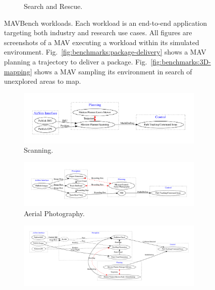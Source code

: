 \begin{figure}[t]
\begin{subfigure}[t]{1.385in}
        \caption{Search and Rescue.}\label{fig:benchmarks:search-and-rescue}
	\end{subfigure}
    \vspace{-5pt}
    \caption{MAVBench workloads. Each workload is an end-to-end application targeting both industry and research use cases. All figures are screenshots of a MAV executing a workload within its simulated environment. Fig.~\ref{fig:benchmarks:package-delivery} shows a MAV planning a trajectory to deliver a package. Fig.~\ref{fig:benchmarks:3D-mapping} shows a MAV sampling its environment in search of unexplored areas to map.}
    \label{fig:bench_screenshot}
\end{figure}

\begin{figure}[t!]
	\centering
	\begin{subfigure}[t]{\columnwidth}
		\centering
        \vspace{-5pt}
		\includegraphics[width=\columnwidth]{figs/data_flow/scanning}
        \vspace{-20pt}
\caption{Scanning.}\label{fig:benchmarks:data-flow:scanning}
	\end{subfigure}
    \begin{subfigure}[t]{\columnwidth}
		\centering
		\includegraphics[width=\columnwidth]{figs/data_flow/aerial_photography}
        \vspace{-20pt}
		\caption{Aerial Photography.}\label{fig:benchmarks:data-flow:aerial_photography}
	\end{subfigure}
	\begin{subfigure}[t]{\columnwidth}
		\centering
		\includegraphics[width=\columnwidth] {figs/data_flow/package_delivery}

\end{subfigure}
\end{figure}
